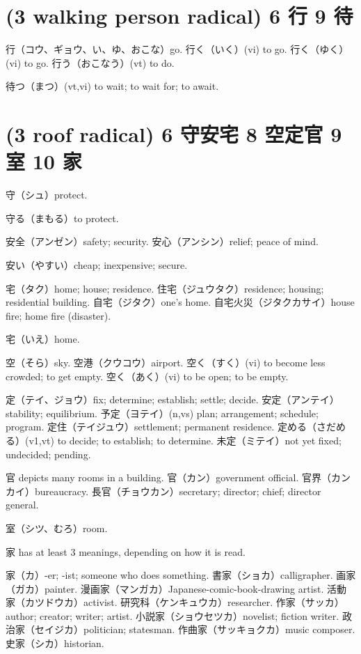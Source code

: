 \section{(3 walking person radical) 6 行 9 待}

行（コウ、ギョウ、い、ゆ、おこな）go.
行く（いく）(vi) to go.
行く（ゆく）(vi) to go.
行う（おこなう）(vt) to do.

待つ（まつ）(vt,vi) to wait; to wait for; to await.

\section{(3 roof radical) 6 守安宅 8 空定官 9 室 10 家}

守（シュ）protect.

守る（まもる）to protect.

安全（アンゼン）safety; security.
安心（アンシン）relief; peace of mind.

安い（やすい）cheap; inexpensive; secure.

宅（タク）home; house; residence.
住宅（ジュウタク）residence; housing; residential building.
自宅（ジタク）one's home.
自宅火災（ジタクカサイ）house fire; home fire (disaster).

宅（いえ）home.

空（そら）sky.
空港（クウコウ）airport.
空く（すく）(vi) to become less crowded; to get empty.
空く（あく）(vi) to be open; to be empty.

定（テイ、ジョウ）fix; determine; establish; settle; decide.
安定（アンテイ）stability; equilibrium.
予定（ヨテイ）(n,vs) plan; arrangement; schedule; program.
定住（テイジュウ）settlement; permanent residence.
定める（さだめる）(v1,vt) to decide; to establish; to determine.
未定（ミテイ）not yet fixed; undecided; pending.

官 depicts many rooms in a building.
官（カン）government official.
官界（カンカイ）bureaucracy.
長官（チョウカン）secretary; director; chief; director general.

室（シツ、むろ）room.

家 has at least 3 meanings, depending on how it is read.

家（カ）-er; -ist; someone who does something.
書家（ショカ）calligrapher.
画家（ガカ）painter.
漫画家（マンガカ）Japanese-comic-book-drawing artist.
活動家（カツドウカ）activist.
研究科（ケンキュウカ）researcher.
作家（サッカ）author; creator; writer; artist.
小説家（ショウセツカ）novelist; fiction writer.
政治家（セイジカ）politician; statesman.
作曲家（サッキョクカ）music composer.
史家（シカ）historian.

